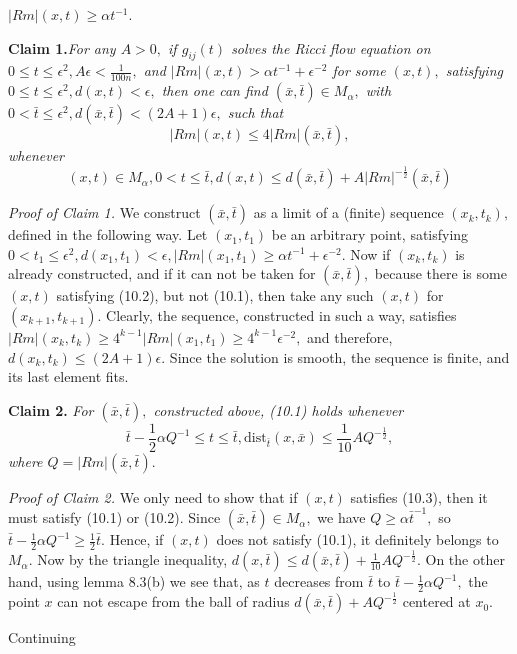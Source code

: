 \documentclass[12pt]{article}
\newcommand{\e}{\epsilon}
\newcommand{\al}{\alpha}
\newcommand{\bx}{\bar{x}}
\newcommand{\bt}{\bar{t}}
\theoremstyle{plain}
{\swapnumbers
\newtheorem{thm}{Theorem}[section]
\newtheorem{cor}[thm]{Corollary}
\newtheorem{lem}[thm]{Lemma}
\newtheorem{prop}[thm]{Proposition}
}
\theoremstyle{definition}
{\swapnumbers
\newtheorem{defn}[thm]{Definition}
\newtheorem{nota}[thm]{Notation}
\newtheorem{parag}[thm]{}
\newtheorem*{parstr}{\addtocounter{thm}{1}\thesection.\arabic{thm}*}
\newtheorem*{intropar}{\addtocounter{thm}{1}\arabic{thm}}
}
\theoremstyle{remark} {\swapnumbers
\newtheorem{rem}[thm]{Remark}
\newtheorem{exam}[thm]{Example}
\newtheorem{lemma}[thm]{Lemma}
\newtheorem{claim}[thm]{Claim}
}
\numberwithin{equation}{section}
\begin{document}
 $|Rm|(x,t)\ge\alpha t^{-1}.$ \par {\bf Claim 1.}{\it  For any $A>0,$ if
 $g_{ij}(t)$ solves the Ricci flow equation on $0\le t\le
 \epsilon^2, A\epsilon<\frac{1}{100n},$ and $|Rm|(x,t)>\alpha
 t^{-1}+\epsilon^{-2}$ for some $(x,t),$ satisfying $0\le t\le
 \epsilon^2, d(x,t)<\epsilon,$ then one can find $(\bx,\bt)\in
 M_{\al},$ with $0<\bt\le \e^2, d(\bx,\bt)<(2A+1)\e,$ such that \begin{equation}
  |Rm|(x,t)\le 4|Rm|(\bx,\bt),\end{equation} whenever \begin{equation} (x,t)\in
 M_{\al}, 0<t\le \bt,
 d(x,t)\le d(\bx,\bt)+A|Rm|^{-\frac{1}{2}}(\bx,\bt)\end{equation} }\par {\it Proof
 of Claim 1.}  We construct $(\bx,\bt)$ as a limit of a (finite)
 sequence $(x_k,t_k),$ defined in the following way. Let
 $(x_1,t_1)$ be an arbitrary point, satisfying $0<t_1\le \e^2,
 d(x_1,t_1)<\e, |Rm|(x_1,t_1)\ge \al t^{-1}+\e^{-2}.$ Now if
 $(x_k,t_k)$ is already constructed, and if it can not be taken
 for $(\bx,\bt),$ because there is some $(x,t)$ satisfying (10.2),
 but not (10.1), then take any such $(x,t)$ for
 $(x_{k+1},t_{k+1}).$ Clearly, the sequence, constructed in such a
 way, satisfies $|Rm|(x_k,t_k)\ge 4^{k-1}|Rm|(x_1,t_1)\ge
 4^{k-1}\e^{-2},$ and therefore, $d(x_k,t_k)\le (2A+1)\e.$ Since
 the solution is smooth, the sequence is finite, and its last
 element fits. \par {\bf Claim 2.} {\it For $(\bx,\bt), $ constructed above,
 (10.1) holds whenever \begin{equation} \bt -\frac{1}{2}\al Q^{-1}\le t\le
 \bt, \mbox{dist}_{\bt}(x,\bx)\le
 \frac{1}{10}AQ^{-\frac{1}{2}},\end{equation}
 where $Q=|Rm|(\bx,\bt).$} \par {\it Proof of Claim 2.}  We only need to
 show that if $(x,t)$ satisfies (10.3), then it must satisfy
 (10.1) or (10.2). Since $(\bx,\bt)\in M_{\al},$ we have $Q\ge
 \al\bt^{-1},$ so $\bt -\frac{1}{2}\al Q^{-1}\ge \frac{1}{2}\bt.$
 Hence, if $(x,t)$ does not satisfy (10.1), it definitely belongs
 to $M_{\al}.$ Now by the triangle inequality, $d(x,\bt)\le
 d(\bx,\bt)+\frac{1}{10}AQ^{-\frac{1}{2}}.$ On the other hand, using
 lemma 8.3(b) we see that, as
 $t$ decreases from $\bt$ to $\bt -\frac{1}{2}\al Q^{-1},$ the
 point $x$ can not escape from the ball of radius
 $d(\bx,\bt)+AQ^{-\frac{1}{2}}$ centered at $x_0.$ \par Continuing
\end{document}
